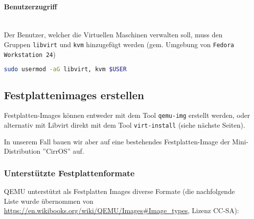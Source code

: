 \paragraph{Benutzerzugriff} \hfill \\
Der Benutzer, welcher die Virtuellen Maschinen verwalten soll, muss den Gruppen \lstinline|libvirt| und \lstinline|kvm| hinzugefügt werden (gem. Umgebung von \lstinline|Fedora Workstation 24|)
\begin{lstlisting}[language=bash]
sudo usermod -aG libvirt, kvm $USER
\end{lstlisting}

\subsection{Festplattenimages erstellen}
Festplatten-Images können entweder mit dem Tool \lstinline|qemu-img| erstellt werden, oder alternativ mit Libvirt direkt mit dem Tool \lstinline|virt-install| (siehe nächste Seiten).

In unserem Fall bauen wir aber auf eine bestehendes Festplatten-Image der Mini-Distribution ''CirrOS'' auf.

\subsubsection{Unterstützte Festplattenformate}
QEMU unterstützt als Festplatten Images diverse Formate (die nachfolgende Liste wurde übernommen von \url{https://en.wikibooks.org/wiki/QEMU/Images#Image_types}, Lizenz CC-SA):

